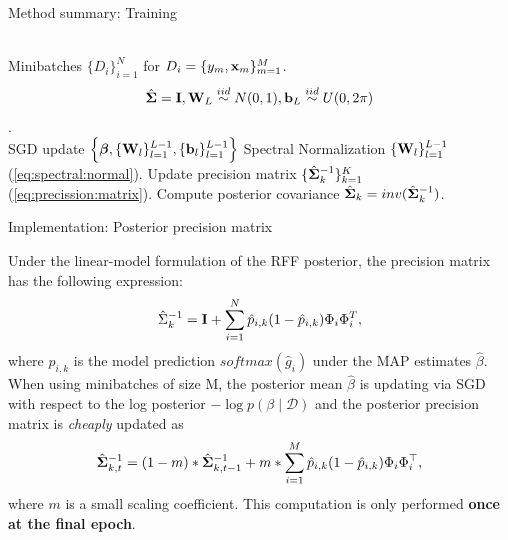 \documentclass[xcolor=table]{beamer}
\begin{document}
\begin{frame}{Method summary: Training}

\begin{algorithm}[H]
   \caption{SNGP Training}
   \label{alg:training}
\begin{algorithmic}[1]
    \\
   Minibatches $\{D_i\}_{i=1}^N$ for $D_i=\{y_m, {\mathbf x}_m\}_{m=1}^M$. %
   \vspace{0.2em}
    \\
    \vspace{-1.2em}
    $$\hat{{\boldsymbol{\Sigma}}}={\mathbf I}, {\mathbf W}_L \stackrel{iid}{\sim} N(0, 1), {\mathbf b}_L \stackrel{iid}{\sim} U(0, 2\pi)$$.\\
     \vspace{-1.2em}
   \STATE %
   SGD update $\Big\{ {\boldsymbol{\beta}}, \{{\mathbf W}_l\}_{l=1}^{L-1}, \{{\mathbf b}_l\}_{l=1}^{L-1} \Big\}$
   \STATE %
   Spectral Normalization $\{{\mathbf W}_l\}_{l=1}^{L-1}$ %
   (\ref{eq:spectral:normal}).
   \STATE %
   Update precision matrix $\{\hat{{\boldsymbol{\Sigma}}}_{k}^{-1}\}_{k=1}^K$ %
   (\ref{eq:precission:matrix}).
   \ENDIF
   \ENDFOR
   \STATE Compute posterior covariance $\hat{{\boldsymbol{\Sigma}}}_k=inv(\hat{{\boldsymbol{\Sigma}}}_k^{-1})$.
\end{algorithmic}
\end{algorithm}

\end{frame}




\begin{frame}{Implementation: Posterior precision matrix}

Under the linear-model formulation of the RFF posterior, the precision matrix has the following expression:
\begin{equation}\label{eq:precission:matrix}
\hat \Sigma_k^{-1} = {\mathbf I} + \sum_{i=1}^N \hat p_{i,k}(1- \hat p_{i,k}) \Phi_i \Phi_i^T,
\end{equation}
where \(\hat p_{i,k}\) is the model prediction \(softmax(\hat g_i)\) under the MAP estimates \(\hat \beta\).\\
\pause
When using minibatches of size M, the posterior mean \(\hat \beta\) is updating via SGD with respect to the log posterior \(-\log p(\beta \mid \mathcal D)\) and the posterior precision matrix is \emph{cheaply} updated as
\[
\hat{{\boldsymbol{\Sigma}}}^{-1}_{k,t}=(1-m)*\hat{{\boldsymbol{\Sigma}}}^{-1}_{k, t-1} + m*\sum_{i=1}^M \hat{p}_{i,k}(1-\hat{p}_{i,k})\Phi_i \Phi_i^\top,
\]
where \(m\) is a small scaling coefficient. This computation is only performed \textbf{once at the final epoch}.



\end{frame}
\end{document}
